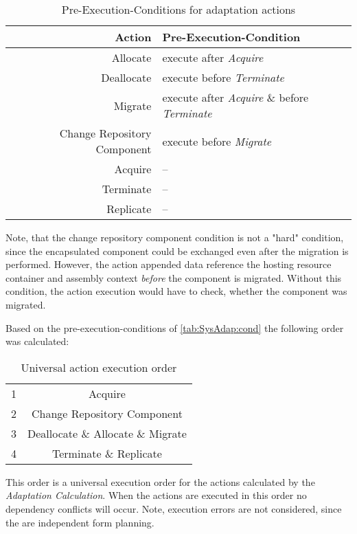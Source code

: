 \begin{table}[h]
	\centering
	\begin{tabular}{r | l}
		\hline
		\textbf{Action} & \textbf{Pre-Execution-Condition} \\
		\hline
		Allocate & execute after \textit{Acquire} \\
		Deallocate & execute before \textit{Terminate} \\
		Migrate & execute after \textit{Acquire} \& before \textit{Terminate} \\
		Change Repository Component & execute before \textit{Migrate} \\
		Acquire & -- \\
		Terminate & -- \\
		Replicate & -- \\
		\hline
	\end{tabular}
	\caption{Pre-Execution-Conditions for adaptation actions}
	\label{tab:SysAdap:cond}
\end{table}

Note, that the change repository component condition is not a "hard" condition, since the encapsulated component could be exchanged even after the migration is performed. However, the action appended data reference the hosting resource container and assembly context \textit{before} the component is migrated. Without this condition, the action execution would have to check, whether the component was migrated.

Based on the pre-execution-conditions of \autoref{tab:SysAdap:cond} the following order was calculated:

\begin{table}[h]
	\centering
	\begin{tabular}{ r | c}
		\hline
		1 & Acquire\\
		2 & Change Repository Component\\
		3 & Deallocate \& Allocate \& Migrate \\
		4 & Terminate \& Replicate\\
		\hline
	\end{tabular}
	\caption{Universal action execution order}
	\label{tab:SysAdap:order}
\end{table}

This order is a universal execution order for the actions calculated by the \textit{Adaptation Calculation}. When the actions are executed in this order no dependency conflicts will occur. Note, execution errors are not considered, since the are independent form planning.



